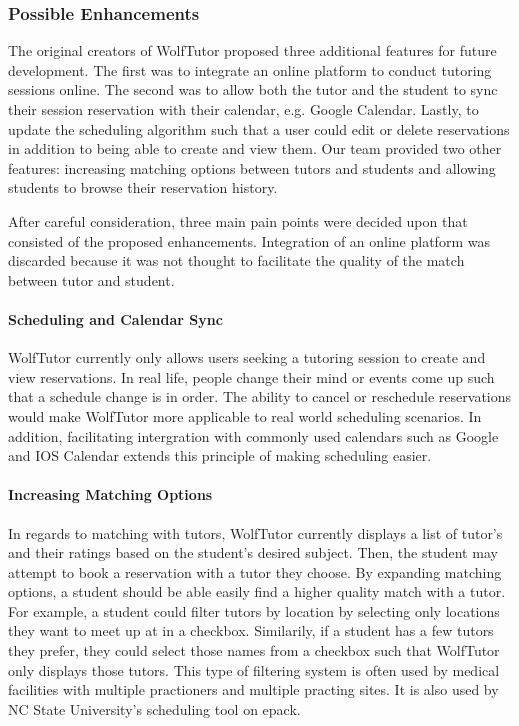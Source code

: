 
\label{sec:possible-enhancements} 

\subsubsection{Possible Enhancements} 
The original creators of WolfTutor proposed
three additional features for future development. The first was to
integrate an online platform to conduct tutoring sessions online. The
second was to allow both the tutor and the student to sync their
session reservation with their calendar, e.g. Google Calendar. Lastly,
to update the scheduling algorithm such that a user could edit or
delete reservations in addition to being able to create and view
them. Our team provided two other features: increasing matching
options between tutors and students and allowing students to browse
their reservation history.

After careful consideration, three main pain points were decided upon
that consisted of the proposed enhancements. Integration of an online
platform was discarded because it was not thought to facilitate the
quality of the match between tutor and student.

\paragraph{Scheduling and Calendar Sync} WolfTutor currently only
allows users seeking a tutoring session to create and view
reservations. In real life, people change their mind or events come up
such that a schedule change is in order. The ability to cancel or
reschedule reservations would make WolfTutor more applicable to real
world scheduling scenarios. In addition, facilitating intergration
with commonly used calendars such as Google and IOS Calendar extends
this principle of making scheduling easier.

\paragraph{Increasing Matching Options} In regards to matching with
tutors, WolfTutor currently displays a list of tutor's and their
ratings based on the student's desired subject. Then, the student may
attempt to book a reservation with a tutor they choose. By expanding
matching options, a student should be able easily find a higher
quality match with a tutor. For example, a student could filter tutors
by location by selecting only locations they want to meet up at in a
checkbox. Similarily, if a student has a few tutors they prefer, they
could select those names from a checkbox such that WolfTutor only
displays those tutors. This type of filtering system is often used by
medical facilities with multiple practioners and multiple practing
sites. It is also used by NC State University's scheduling tool on
epack.

